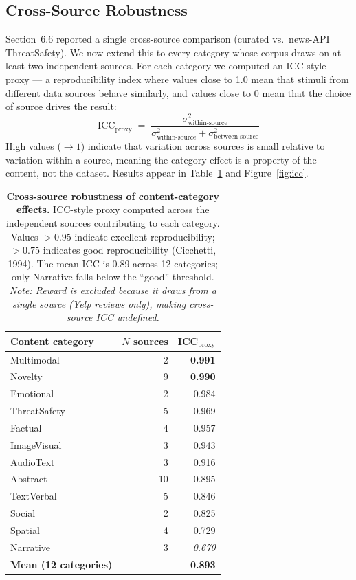 \documentclass[11pt,letterpaper]{article}
\begin{document}
\subsection{Cross-Source Robustness}\label{sec:robust}

Section~6.6 reported a single cross-source comparison (curated vs.\ news-API ThreatSafety). We now extend this to every category whose corpus draws on at least two independent sources. For each category we computed an ICC-style proxy --- a reproducibility index where values close to 1.0 mean that stimuli from different data sources behave similarly, and values close to 0 mean that the choice of source drives the result:
$$
\text{ICC}_{\text{proxy}} \;=\; \frac{\sigma^2_{\text{within-source}}}{\sigma^2_{\text{within-source}} + \sigma^2_{\text{between-source}}}
$$
High values (${\to}1$) indicate that variation across sources is small relative to variation within a source, meaning the category effect is a property of the content, not the dataset. Results appear in Table~\ref{tab:icc} and Figure~\ref{fig:icc}.

\begin{table}[ht]
\centering
\small
\caption{\textbf{Cross-source robustness of content-category effects.} ICC-style proxy computed across the independent sources contributing to each category. Values $> 0.95$ indicate excellent reproducibility; $> 0.75$ indicates good reproducibility (Cicchetti, 1994). The mean ICC is 0.89 across 12 categories; only Narrative falls below the ``good'' threshold. \textit{Note: Reward is excluded because it draws from a single source (Yelp reviews only), making cross-source ICC undefined.}}
\label{tab:icc}
\begin{tabularx}{\linewidth}{Xrr}
\toprule
\textbf{Content category} & \textbf{$N$ sources} & \textbf{ICC$_{\text{proxy}}$} \\
\midrule
Multimodal             & 2  & \textbf{0.991} \\
Novelty                & 9  & \textbf{0.990} \\
Emotional              & 2  & 0.984 \\
ThreatSafety           & 5  & 0.969 \\
Factual                & 4  & 0.957 \\
ImageVisual            & 3  & 0.943 \\
AudioText              & 3  & 0.916 \\
Abstract               & 10 & 0.895 \\
TextVerbal             & 5  & 0.846 \\
Social                 & 2  & 0.825 \\
Spatial                & 4  & 0.729 \\
Narrative              & 3  & \textit{0.670} \\
\midrule
\textbf{Mean (12 categories)} &  & \textbf{0.893} \\
\bottomrule
\end{tabularx}
\end{table}
\end{document}
